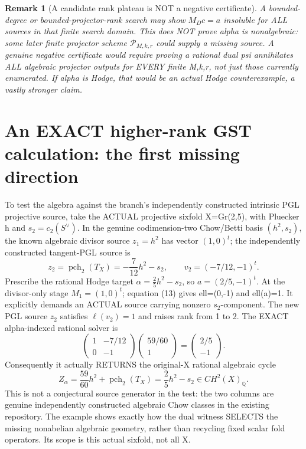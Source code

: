 \documentclass[11pt]{article}
\newtheorem{remark}[theorem]{Remark}
\begin{document}
\begin{remark}[A candidate rank plateau is NOT a negative certificate]
A bounded-degree or bounded-projector-rank search
may show \(M_D c=a\) insoluble for ALL sources
in that finite search domain. This does NOT prove
alpha is nonalgebraic: some later finite
projector scheme \(\mathcal P_{M,k,r}\) could
supply a missing source. A genuine negative
certificate would require proving a rational dual
psi annihilates ALL algebraic projector outputs
for EVERY finite M,k,r, not just those currently
enumerated. If alpha is Hodge, that would be an
actual Hodge counterexample, a vastly stronger claim.
\end{remark}

\section{An EXACT higher-rank GST calculation: the first missing direction}
To test the algebra against the branch's independently
constructed intrinsic PGL projective source, take the
ACTUAL projective sixfold X=Gr(2,5),
with Pluecker h and \(s_2=c_2(S^\vee)\).
In the genuine codimension-two Chow/Betti basis
\((h^2,s_2)\), the known algebraic
divisor source \(z_1=h^2\) has vector \((1,0)^t\);
the independently constructed tangent-PGL
source is
\[
 z_2=\operatorname{pch}_2(T_X)
               =-\frac7{12}h^2-s_2,
 \qquad v_2=(-7/12,-1)^t.                     \tag{16}
\]
Prescribe the rational Hodge target
\(\alpha=\frac25h^2-s_2\),
so \(a=(2/5,-1)^t\).
At the divisor-only stage \(M_1=(1,0)^t\);
equation (13) gives ell=(0,-1) and
ell(a)=1. It explicitly demands an ACTUAL
source carrying nonzero \(s_2\)-component.
The new PGL source \(z_2\) satisfies
\(\ell(v_2)=1\) and raises rank from 1 to 2.
The EXACT alpha-indexed rational solver is
\[
 \boxed{
 \begin{pmatrix}1&-7/12\\0&-1\end{pmatrix}
 \begin{pmatrix}59/60\\1\end{pmatrix}
 =\begin{pmatrix}2/5\\-1\end{pmatrix}.
 }                                                     \tag{17}
\]
Consequently it actually RETURNS the original-X
rational algebraic cycle
\[
 \boxed{Z_\alpha=\frac{59}{60}h^2+
     \operatorname{pch}_2(T_X)
       =\frac25h^2-s_2
       \in CH^2(X)_{\mathbb Q}.}                \tag{18}
\]
This is not a conjectural source generator in the
test: the two columns are genuine independently
constructed algebraic Chow classes in the
existing repository. The example shows exactly
how the dual witness SELECTS the missing
nonabelian algebraic geometry, rather than
recycling fixed scalar fold operators.
Its scope is this actual sixfold, not all X.
\end{document}
